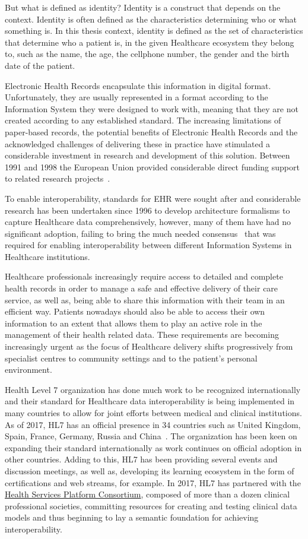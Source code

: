 But what is defined as identity? Identity is a construct that depends on the
context. Identity is often defined as the characteristics determining who or
what something is. In this thesis context, identity is defined as the set of
characteristics that determine who a patient is, in the given Healthcare
ecosystem they belong to, such as the name, the age, the cellphone number, the
gender and the birth date of the patient.  

Electronic Health Records encapsulate this information in digital format.
Unfortunately, they are usually represented in a format according to the
Information System they were designed to work with, meaning that they are not
created according to any established standard. The increasing limitations of
paper-based records, the potential benefits of Electronic Health Records and
the acknowledged challenges of delivering these in practice have stimulated a
considerable investment in research and development of this solution.  Between
1991 and 1998 the European Union provided considerable direct funding support
to related research projects~\cite{Kalra2006}.

To enable interoperability, standards for EHR were sought after and
considerable research has been undertaken since 1996 to develop architecture
formalisms to capture Healthcare data comprehensively, however, many of them
have had no significant adoption, failing to bring the much needed
consensus~\cite{Eichelberg2006} that was required for enabling interoperability
between different Information Systems in Healthcare institutions. 

Healthcare professionals increasingly require access to detailed and complete
health records in order to manage a safe and effective delivery of their care
service, as well as, being able to share this information with their team in an
efficient way. Patients nowadays should also be able to access their own
information to an extent that allows them to play an active role in the
management of their health related data. These requirements are becoming
increasingly urgent as the focus of Healthcare delivery shifts progressively
from specialist centres to community settings and to the patient’s personal
environment.

Health Level 7 organization has done much work to be recognized internationally
and their standard for Healthcare data interoperability is being implemented in
many countries to allow for joint efforts between medical and clinical
institutions.  As of 2017, HL7 has an official presence in 34 countries such as
United Kingdom, Spain, France, Germany, Russia and China~\cite{HL7Anual2016}.
The organization has been keen on expanding their standard internationally as
work continues on official adoption in other countries. Adding to this, HL7 has
been providing several events and discussion meetings, as well as, developing
its learning ecosystem in the form of certifications and web streams, for
example. In 2017, HL7 has partnered with the
\href{https://www.hspconsortium.org/}{Health Services Platform Consortium},
composed of more than a dozen clinical professional societies, committing
resources for creating and testing clinical data models and thus beginning to
lay a semantic foundation for achieving interoperability.

